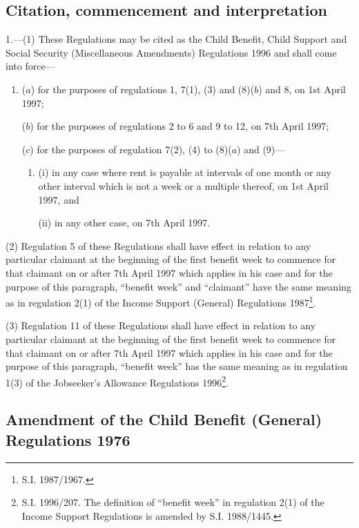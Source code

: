 \documentclass[a4paper]{article}
\newcommand\fnote[1]{\footnote{\frenchspacing #1}}
\begin{document}
{\sloppy

\tableofcontents

}

\setcounter{secnumdepth}{-2}

\subsection[1. Citation, commencement and interpretation]{Citation, commencement and interpretation}

1.—(1) These Regulations may be cited as the Child Benefit, Child Support and Social Security (Miscellaneous Amendments) Regulations 1996 and shall come into force—
\begin{enumerate}\item[]
($a$) for the purposes of regulations 1, 7(1), (3) and (8)($b$) and 8, on 1st April 1997;

($b$) for the purposes of regulations 2 to 6 and 9 to 12, on 7th April 1997;

($c$) for the purposes of regulation 7(2), (4) to (8)($a$) and (9)—
\begin{enumerate}\item[]
(i) in any case where rent is payable at intervals of one month or any other interval which is not a week or a multiple thereof, on 1st April 1997, and

(ii) in any other case, on 7th April 1997.
\end{enumerate}
\end{enumerate}

(2) Regulation 5 of these Regulations shall have effect in relation to any particular claimant at the beginning of the first benefit week to commence for that claimant on or after 7th April 1997 which applies in his case and for the purpose of this paragraph, “benefit week” and “claimant” have the same meaning as in regulation 2(1) of the Income Support (General) Regulations 1987\fnote{S.I. 1987/1967.}.

(3) Regulation 11 of these Regulations shall have effect in relation to any particular claimant at the beginning of the first benefit week to commence for that claimant on or after 7th April 1997 which applies in his case and for the purpose of this paragraph, “benefit week” has the same meaning as in regulation 1(3) of the Jobseeker’s Allowance Regulations 1996\fnote{S.I. 1996/207. The definition of “benefit week” in regulation 2(1) of the Income Support Regulations is amended by S.I. 1988/1445.}.

\subsection[2. Amendment of the Child Benefit (General) Regulations 1976]{Amendment of the Child Benefit (General) Regulations 1976}
\end{document}
